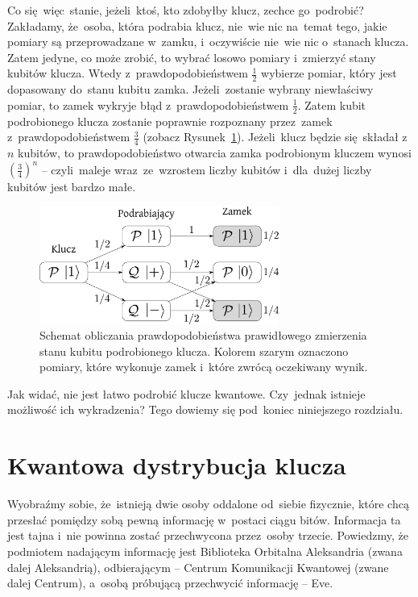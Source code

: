 Co się~więc~stanie, jeżeli~ktoś, kto zdobyłby klucz, zechce go~podrobić?
Zakładamy, że~osoba, która podrabia klucz, nie~wie nic na~temat tego, jakie pomiary są
przeprowadzane w~zamku, i~oczywiście nie~wie nic o~stanach klucza. Zatem jedyne, co może zrobić,
to wybrać losowo pomiary i~zmierzyć stany kubitów klucza. Wtedy z~prawdopodobieństwem
$\frac{1}{2}$ wybierze pomiar, który jest dopasowany do~stanu kubitu zamka.
Jeżeli~zostanie wybrany niewłaściwy pomiar, to zamek wykryje błąd z~prawdopodobieństwem
$\frac{1}{2}$. Zatem kubit podrobionego klucza zostanie poprawnie
rozpoznany przez~zamek z~prawdopodobieństwem $\frac{3}{4}$ (zobacz Rysunek~\ref{rys:zamek}).
Jeżeli~klucz będzie się~składał z~$n$ kubitów, to prawdopodobieństwo otwarcia
zamka podrobionym kluczem wynosi $\left(\frac{3}{4}\right)^n$ -- czyli~maleje
wraz~ze~wzrostem liczby kubitów i~dla~dużej liczby kubitów jest bardzo małe.

\begin{figure}[h]
	\centering
	\includegraphics[width=0.7\textwidth]{pics/zamekkwantowy}
	\caption{Schemat obliczania prawdopodobieństwa prawidłowego
		zmierzenia stanu kubitu podrobionego klucza. Kolorem szarym oznaczono
		pomiary, które wykonuje zamek i~które zwrócą oczekiwany wynik.}
	\label{rys:zamek}
\end{figure}


Jak widać, nie jest łatwo podrobić klucze kwantowe. Czy~jednak istnieje
możliwość ich wykradzenia? Tego dowiemy się pod~koniec niniejszego rozdziału.

\section{Kwantowa dystrybucja klucza}
Wyobraźmy sobie, że~istnieją dwie osoby oddalone od~siebie fizycznie,
które chcą przesłać pomiędzy sobą pewną informację w~postaci ciągu
bitów. Informacja ta jest tajna i~nie powinna zostać przechwycona
przez~osoby trzecie. Powiedzmy, że
podmiotem nadającym informację jest Biblioteka Orbitalna Aleksandria
(zwana dalej Aleksandrią), odbierającym -- Centrum Komunikacji Kwantowej
(zwane dalej Centrum), a~osobą próbującą przechwycić informację -- Eve.

